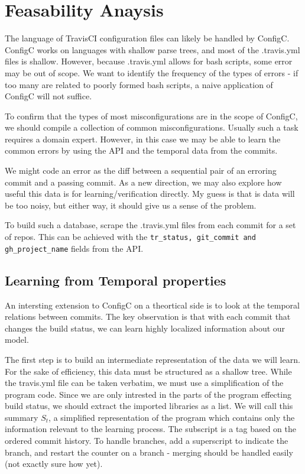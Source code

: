 \documentclass{sigplanconf}
\begin{document}
\section{Feasability Anaysis}
\label{sec:feas}

The language of TravisCI configuration files can likely be handled by ConfigC.
ConfigC works on languages with shallow parse trees, and most of the .travis.yml files is shallow.
However, because .travis.yml allows for bash scripts, some error may be out of scope.
We want to identify the frequency of the types of errors - if too many are related to poorly formed bash scripts, a naive application of ConfigC will not suffice.

To confirm that the types of most misconfigurations are in the scope of ConfigC, we should compile a collection of common misconfigurations.
Usually such a task requires a domain expert.
However, in this case we may be able to learn the common errors by using the API and the temporal data from the commits.

We might code an error as the diff between a sequential pair of an erroring commit and a passing commit.
As a new direction, we may also explore how useful this data is for learning/verification directly.
My guess is that is data will be too noisy, but either way, it should give us a sense of the problem.

To build such a database, scrape the .travis.yml files from each commit for a set of repos.
This can be achieved with the \verb|tr_status, git_commit and gh_project_name| fields from the API.

\subsection{Learning from Temporal properties}

An intersting extension to ConfigC on a theortical side is to look at the temporal relations between commits.
The key observation is that with each commit that changes the build status, we can learn highly localized information about our model.

The first step is to build an intermediate representation of the data we will learn.
For the sake of efficiency, this data must be structured as a shallow tree.
While the travis.yml file can be taken verbatim, we must use a simplification of the program code.
Since we are only intrested in the parts of the program effecting build status, we should extract the imported libraries as a list.
We will call this summary $S_t$, a simplified representation of the program which contains only the information relevant to the learning process.
The subscript is a tag based on the ordered commit history.
To handle branches, add a superscript to indicate the branch, and restart the counter on a branch - merging should be handled easily (not exactly sure how yet).
\end{document}
